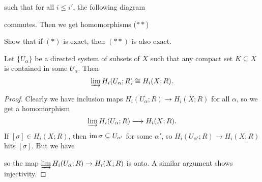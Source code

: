 \begin{exercise}
\begin{enumerate}
      such that for all $i \le i'$, the
      following diagram
      \begin{center}
      \end{center}
      commutes. Then we get homomorphisms ($**$)
      \begin{center}
      \end{center}
      Show that if $(*)$ is exact, then
      $(**)$ is also exact.
  \end{enumerate}
\end{exercise}

\begin{lemma}\label{lem:direct-limit}
  Let $\{U_\alpha\}$ be a directed system
  of subsets of $X$ such that any compact
  set $K \subseteq X$ is contained in some
  $U_\alpha$. Then
  \[
    \varinjlim H_i(U_\alpha; R)
    \cong H_i(X; R).
  \]
\end{lemma}

\begin{proof}
  Clearly we have inclusion maps
  $H_i(U_\alpha; R) \to H_i(X; R)$ for all
  $\alpha$, so we get a homomorphism
  \[
    \varinjlim H_i(U_\alpha; R)
    \longrightarrow H_i(X; R).
  \]
  If $[\sigma] \in H_i(X; R)$, then
  $\operatorname{im} \sigma \subseteq U_{\alpha'}$ for
  some $\alpha'$, so
  $H_i(U_{\alpha'}; R) \to H_i(X; R)$
  hits $[\sigma]$. But we have
  \begin{center}
  \end{center}
  so the map $\varinjlim H_i(U_\alpha; R) \to H_i(X; R)$
  is onto.
  A similar argument shows injectivity.
\end{proof}
